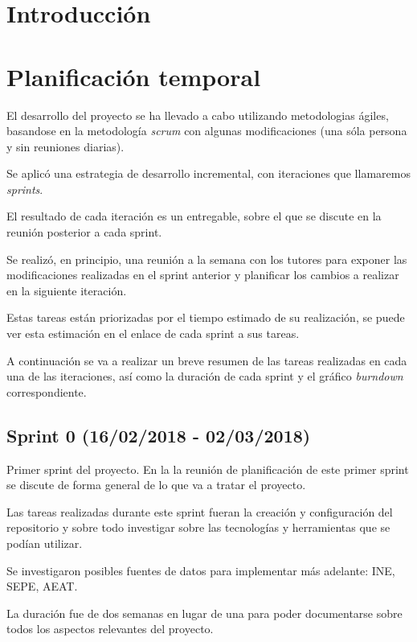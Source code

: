 
\section{Introducción}

\section{Planificación temporal}

El desarrollo del proyecto se ha llevado a cabo utilizando metodologias ágiles, basandose en la metodología \textit{scrum} con algunas modificaciones (una sóla persona y sin reuniones diarias).

Se aplicó una estrategia de desarrollo incremental, con iteraciones que llamaremos \textit{sprints}.

El resultado de cada iteración es un entregable, sobre el que se discute en la reunión posterior a cada sprint.

Se realizó, en principio, una reunión a la semana con los tutores para exponer las modificaciones realizadas en el sprint anterior y planificar los cambios a realizar en la siguiente iteración. 

Estas tareas están priorizadas por el tiempo estimado de su realización, se puede ver esta estimación en el enlace de cada sprint a sus tareas. 

A continuación se va a realizar un breve resumen de las tareas realizadas en cada una de las iteraciones, así como la duración de cada sprint y el gráfico \textit{burndown} correspondiente.

\subsection{Sprint 0 (16/02/2018 - 02/03/2018)}

Primer sprint del proyecto. En la la reunión de planificación de este primer sprint se discute de forma general de lo que va a tratar el proyecto. 

Las tareas realizadas durante este sprint fueran la creación y configuración del repositorio y sobre todo investigar sobre las tecnologías y herramientas que se podían utilizar.

Se investigaron posibles fuentes de datos para implementar más adelante: INE, SEPE, AEAT.

La duración fue de dos semanas en lugar de una para poder documentarse sobre todos los aspectos relevantes del proyecto.

